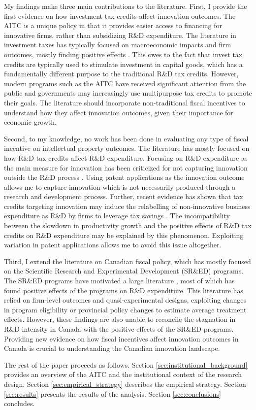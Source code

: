 \documentclass[../main.tex]{subfiles}
\begin{document}
My findings make three main contributions to the literature. First, I provide the first evidence on how investment tax credits affect innovation outcomes. The AITC is a unique policy in that it provides easier access to financing for innovative firms, rather than subsidizing R\&D expenditure. The literature in investment taxes has typically focused on macroeconomic impacts and firm outcomes, mostly finding positive effects \parencite{pereira94, lyon89, slattery_zidar20}. This owes to the fact that invest tax credits are typically used to stimulate investment in capital goods, which has a fundamentally different purpose to the traditional R\&D tax credits. However, modern programs such as the AITC have received significant attention from the public \parencite{albertachamberofcommerce23,zabjeck16} and governments may increasingly use multipurpose tax credits to promote their goals. The literature should incorporate non-traditional fiscal incentives to understand how they affect innovation outcomes, given their importance for economic growth. 

Second, to my knowledge, no work has been done in evaluating any type of fiscal incentive on intellectual property outcomes. The literature has mostly focused on how R\&D tax credits affect R\&D expenditure. Focusing on R\&D expenditure as the main measure for innovation has been criticized for not capturing innovation outside the R\&D process \parencite{xie_etal19}. Using patent applications as the innovation outcome allows me to capture innovation which is not necessarily produced through a research and development process. Further, recent evidence has shown that tax credits targeting innovation may induce the relabelling of non-innovative business expenditure as R\&D by firms to leverage tax savings \parencite{chen_etal21}. The incompatibility between the slowdown in productivity growth and the positive effects of R\&D tax credits on R\&D expenditure may be explained by this phenomenon. Exploiting variation in patent applications allows me to avoid this issue altogether.

Third, I extend the literature on Canadian fiscal policy, which has mostly focused on the Scientific Research and Experimental Development (SR\&ED) programs. The SR\&ED programs have motivated a large literature \parencite{agrawal_etal20,czarnitzki_etal11,berube_mohnen09,mansfield_switzer85a,bernstein86b}, most of which has found positive effects of the programs on R\&D expenditure. This literature has relied on firm-level outcomes and quasi-experimental designs, exploiting changes in program eligibility or provincial policy changes to estimate average treatment effects. However, these findings are also unable to reconcile the stagnation in R\&D intensity in Canada with the positive effects of the SR\&ED programs. Providing new evidence on how fiscal incentives affect innovation outcomes in Canada is crucial to understanding the Canadian innovation landscape. 

The rest of the paper proceeds as follows. Section \ref{sec:institutional_background} provides an overview of the AITC and the institutional context of the research design. Section \ref{sec:empirical_strategy} describes the empirical strategy. Section \ref{sec:results} presents the results of the analysis. Section \ref{sec:conclusions} concludes.
\end{document}
